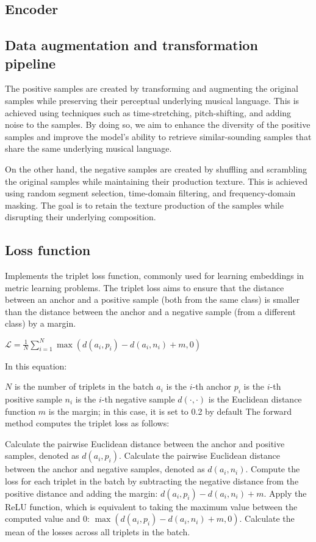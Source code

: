 \subsection{Encoder}


\subsection{Data augmentation and transformation pipeline}
The positive samples are created by transforming and augmenting the original samples while preserving their perceptual underlying musical language. This is achieved using techniques such as time-stretching, pitch-shifting, and adding noise to the samples. By doing so, we aim to enhance the diversity of the positive samples and improve the model's ability to retrieve similar-sounding samples that share the same underlying musical language.

On the other hand, the negative samples are created by shuffling and scrambling the original samples while maintaining their production texture. This is achieved using random segment selection, time-domain filtering, and frequency-domain masking. The goal is to retain the texture production of the samples while disrupting their underlying composition.

\subsection{Loss function}

Implements the triplet loss function, commonly used for learning embeddings in metric learning problems. The triplet loss aims to ensure that the distance between an anchor and a positive sample (both from the same class) is smaller than the distance between the anchor and a negative sample (from a different class) by a margin.

$\mathcal{L} = \frac{1}{N}\sum_{i=1}^{N} \max \left( d\left(a_i, p_i\right) - d\left(a_i, n_i\right) + m, 0 \right)$

In this equation:

$N$ is the number of triplets in the batch
$a_i$ is the $i$-th anchor
$p_i$ is the $i$-th positive sample
$n_i$ is the $i$-th negative sample
$d(\cdot, \cdot)$ is the Euclidean distance function
$m$ is the margin; in this case, it is set to 0.2 by default
The forward method computes the triplet loss as follows:

Calculate the pairwise Euclidean distance between the anchor and positive samples, denoted as $d(a_i, p_i)$.
Calculate the pairwise Euclidean distance between the anchor and negative samples, denoted as $d(a_i, n_i)$.
Compute the loss for each triplet in the batch by subtracting the negative distance from the positive distance and adding the margin: $d(a_i, p_i) - d(a_i, n_i) + m$.
Apply the ReLU function, which is equivalent to taking the maximum value between the computed value and 0: $\max \left( d(a_i, p_i) - d(a_i, n_i) + m, 0 \right)$.
Calculate the mean of the losses across all triplets in the batch.